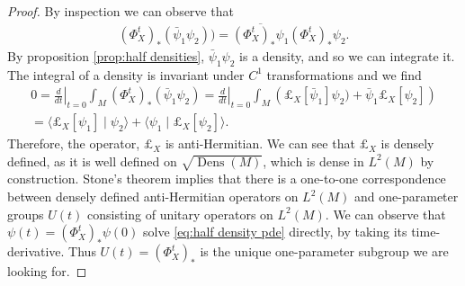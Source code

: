 \documentclass[final,leqno]{siamltex1213}
\DeclareMathOperator{\Dens}{Dens}
\begin{document}
\begin{proof}
	By inspection we can observe that
	\begin{align*}
		 (\Phi_{X}^{t})_{*} ( \bar{\psi}_{1} \psi_{2}) ) = \overline{ (\Phi_{X}^{t})_{*} \psi_{1} } (\Phi_{X}^{t})_{*} \psi_{2}.
	\end{align*}
	By proposition \ref{prop:half densities}, $\bar{\psi}_{1} \psi_{2}$ is a density, and so we can integrate it.
	The integral of a density is invariant under $C^{1}$ transformations \cite[Proposition 16.42]{Lee2006} and we find
	\begin{align*}
		0 = \left. \frac{d}{dt} \right|_{t=0} \int_{M} (\Phi_{X}^{t})_{*} (\bar{\psi}_{1} \psi_{2}) = \left. \frac{d}{dt} \right|_{t=0} \int_{M} \left( \pounds_{X}[\bar{\psi}_{1} ] \psi_{2})  + \bar{\psi}_{1} \pounds_{X}[\psi_{2}] \right) \\
		= \langle \pounds_{X}[\psi_{1}]  \mid \psi_{2} \rangle + \langle \psi_{1} \mid \pounds_{X}[\psi_{2}] \rangle.
	\end{align*}
	Therefore, the operator, $\pounds_{X}$ is anti-Hermitian.
	We can see that $\pounds_{X}$ is densely defined, as it is well defined on $\sqrt{\Dens(M)}$, which is dense in $L^{2}(M)$ by construction.
	Stone's theorem implies that there is a one-to-one correspondence between densely defined anti-Hermitian operators on $L^{2}(M)$
	and one-parameter groups $U(t)$ consisting of unitary operators on $L^{2}(M)$.
	We can observe that $\psi(t) = (\Phi_{X}^{t})_{*} \psi(0)$ solve \eqref{eq:half density pde} directly, by taking its time-derivative.
	Thus $U(t) =  (\Phi_{X}^{t})_{*} $ is the unique one-parameter subgroup we are looking for.
\end{proof}
\end{document}
